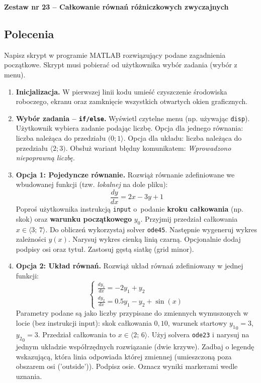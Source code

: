 \documentclass[a4paper,11pt]{article}
\begin{document}
\clearpage
\begin{center}
  {\large\bfseries Zestaw nr 23 \quad -- \quad Całkowanie równań różniczkowych zwyczajnych}
\end{center}
\hrulefill
\vspace{0.4cm}

\subsection*{Polecenia}

Napisz skrypt w programie MATLAB rozwiązujący podane zagadnienia początkowe. Skrypt musi pobierać od użytkownika wybór zadania (wybór z menu).

\begin{enumerate}[leftmargin=*, label=\textbf{\arabic*.}, itemsep=2pt]

  \item \textbf{Inicjalizacja.}
    W pierwszej linii kodu umieść czyszczenie środowiska roboczego, ekranu oraz zamknięcie wszystkich otwartych okien graficznych.

  \item \textbf{Wybór zadania -- \texttt{if/else}.}
    Wyświetl czytelne menu (np. używając \texttt{disp}). Użytkownik wybiera zadanie podając liczbę. Opcja dla jednego równania: liczba należąca do przedziału $(0; 1\rangle$. Opcja dla układu: liczba należąca do przedziału $\langle 2; 3)$. Obsłuż wariant błędny komunikatem: \textit{Wprowadzono niepoprawną liczbę}.

  \item \textbf{Opcja 1: Pojedyncze równanie.}
    Rozwiąż równanie zdefiniowane we wbudowanej funkcji (tzw. \textit{lokalnej} na dole pliku):
    \[ \frac{dy}{dx} = 2x - 3y + 1 \]
    Poproś użytkownika instrukcją \texttt{input} o~podanie \textbf{kroku całkowania} (np. skok) oraz \textbf{warunku początkowego} $y_0$. Przyjmij przedział całkowania $x \in \langle 3;\,7 \rangle$.
    Do obliczeń wykorzystaj solver \texttt{ode45}. Następnie wygeneruj wykres zależności $y(x)$. Narysuj wykres cienką linią czarną. Opcjonalnie dodaj podpisy osi oraz tytuł. Zastosuj gęstą siatkę (grid minor).

  \item \textbf{Opcja 2: Układ równań.}
    Rozwiąż układ równań zdefiniowany w jednej funkcji:\\[-0.5em]
    \[
    \begin{cases}
      \frac{dy_1}{dx} = -2y_1 + y_2 \\
      \frac{dy_2}{dx} = 0.5y_1 - y_2 + \sin(x)
    \end{cases}
    \]
    Parametry podane są jako liczby przypisane do zmiennych wymuszonych w locie (bez instrukcji input): skok całkowania $0{,}10$, warunek startowy $ {y_1}_{0} = 3 $, $ {y_2}_{0} = 3 $. Przedział całkowania to $x \in \langle 2;\,6 \rangle$.
    Użyj solvera \texttt{ode23} i narysuj na jednym układzie współrzędnych rozwiązanie (dwie krzywe). Zadbaj o legendę wskazującą, która linia odpowiada której zmiennej (umieszczoną poza obszarem osi ('outside')). Podpisz osie. Oznacz wyniki markerami wedle uznania.

\end{enumerate}
\end{document}
